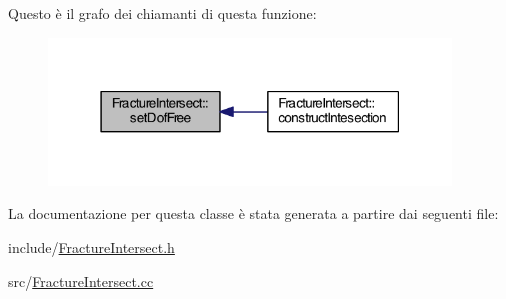 Questo è il grafo dei chiamanti di questa funzione\-:\nopagebreak
\begin{figure}[H]
\begin{center}
\leavevmode
\includegraphics[width=303pt]{classFractureIntersect_a5290dda06af2f6ba24a37f93d3bb4e95_icgraph}
\end{center}
\end{figure}




La documentazione per questa classe è stata generata a partire dai seguenti file\-:\begin{DoxyCompactItemize}
\item 
include/\hyperlink{FractureIntersect_8h}{Fracture\-Intersect.\-h}\item 
src/\hyperlink{FractureIntersect_8cc}{Fracture\-Intersect.\-cc}\end{DoxyCompactItemize}
